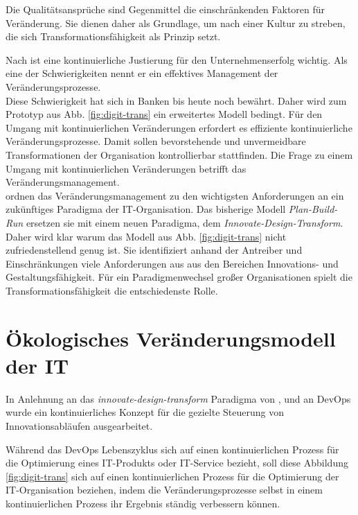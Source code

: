 Die Qualitätsansprüche sind Gegenmittel die einschränkenden Faktoren für Veränderung.
Sie dienen daher als Grundlage, um nach einer Kultur zu streben, die sich Transformationsfähigkeit als Prinzip setzt.

Nach \citet[S.30]{Bussmann2006} ist eine kontinuierliche Justierung für den Unternehmenserfolg wichtig. Als eine der Schwierigkeiten nennt er ein effektives Management der Veränderungsprozesse.
\medskip
\\
Diese Schwierigkeit hat sich in Banken bis heute noch bewährt.
Daher wird zum Prototyp aus Abb. \ref{fig:digit-trans} ein erweitertes Modell bedingt. Für den Umgang mit kontinuierlichen Veränderungen erfordert es effiziente kontinuierliche Veränderungsprozesse.
Damit sollen bevorstehende und unvermeidbare Transformationen der Organisation kontrollierbar stattfinden.
Die Frage zu einem Umgang mit kontinuierlichen Veränderungen betrifft das Veränderungsmanagement.
\medskip
\\
\citet[S. 184f]{Koch2016} ordnen das Veränderungsmanagement zu den wichtigsten Anforderungen an ein zukünftiges Paradigma der IT-Organisation. Das bisherige Modell \emph{Plan-Build-Run} ersetzen sie mit einem neuen Paradigma, dem \emph{Innovate-Design-Transform}.
\medskip
\\
Daher wird klar warum das Modell aus Abb. \ref{fig:digit-trans} nicht zufriedenstellend genug ist. Sie identifiziert anhand der Antreiber und Einschränkungen viele Anforderungen aus \cite[Tab. 11.1]{Koch2016} aus den Bereichen Innovations- und Gestaltungsfähigkeit. Für ein Paradigmenwechsel großer Organisationen spielt die Transformationsfähigkeit die entschiedenste Rolle.

\section{Ökologisches Veränderungsmodell der IT}
\label{idta-modell-chap}
In Anlehnung an das  \emph{innovate-design-transform} Paradigma von \citet{Koch2016}, und an DevOps wurde ein kontinuierliches Konzept für die gezielte Steuerung von Innovationsabläufen \cite{Ganswindt2006} ausgearbeitet.

Während das DevOps Lebenszyklus \cite{Alt2017} sich auf einen kontinuierlichen Prozess für die Optimierung eines IT-Produkts oder IT-Service bezieht, soll diese Abbildung \ref{fig:digit-trans} sich auf einen kontinuierlichen Prozess für die Optimierung der IT-Organisation beziehen, indem die Veränderungsprozesse selbst in einem kontinuierlichen Prozess ihr Ergebnis ständig verbessern können.
\medskip
\\
 
